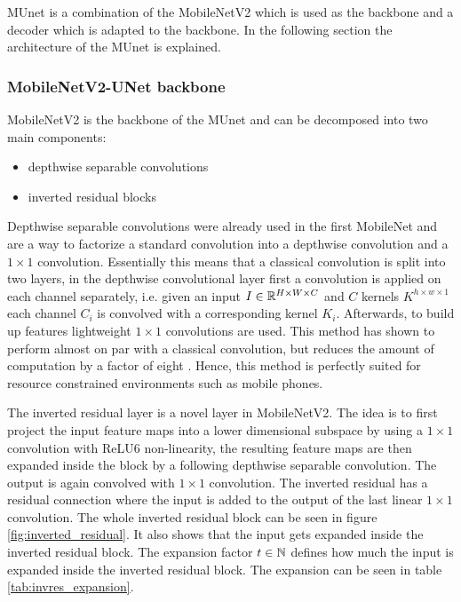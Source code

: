\ac{MUnet} is a combination of the MobileNetV2 \cite{mnetv2} which is used as the backbone and a decoder which is adapted to the backbone.
In the following section the architecture of the \ac{MUnet} is explained.

\subsubsection{MobileNetV2-UNet backbone}

MobileNetV2 is the backbone of the \ac{MUnet} and can be decomposed into two main components:

\begin{itemize}
    \item depthwise separable convolutions
    \item inverted residual blocks
\end{itemize}

Depthwise separable convolutions were already used in the first MobileNet and are a way to factorize a standard convolution into a depthwise convolution and a $1\times1$ convolution.
Essentially this means that a classical convolution is split into two layers, in the depthwise convolutional layer first a convolution is applied on each channel separately, i.e. given an input $I \in \mathbb{R}^{H \times W \times C}$ and $C$ kernels $K^{h \times w \times 1}$ each channel $C_i$ is convolved with a corresponding kernel $K_i$.
Afterwards, to build up features lightweight $1 \times 1$ convolutions are used.
This method has shown to perform almost on par with a classical convolution, but reduces the amount of computation by a factor of eight \cite{mnetv1}.
Hence, this method is perfectly suited for resource constrained environments such as mobile phones.

The inverted residual layer is a novel layer in MobileNetV2.
The idea is to first project the input feature maps into a lower dimensional subspace by using a $1 \times 1$ convolution with ReLU6 non-linearity, the resulting feature maps are then expanded inside the block by a following depthwise separable convolution.
The output is again convolved with $1 \times 1$ convolution.
The inverted residual has a residual connection where the input is added to the output of the last linear $1 \times 1$ convolution.
The whole inverted residual block can be seen in figure \ref{fig:inverted_residual}.
It also shows that the input gets expanded inside the inverted residual block.
The expansion factor $t \in \mathbb{N}$ defines how much the input is expanded inside the inverted residual block.
The expansion can be seen in table \ref{tab:invres_expansion}.

